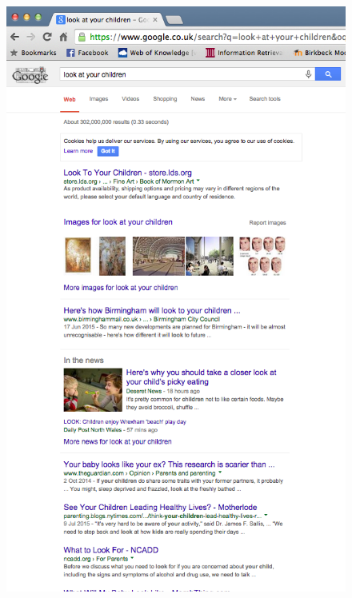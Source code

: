 \documentclass[a4paper, 11pt]{article}
\begin{document}
\begin{enumerate}
{\begin{figure}[H]
\begin{center}
\includegraphics[scale=0.7]{lookAtUrChildren}\\
\end{center}
\end{figure}

}
\end{enumerate}
\end{document}
